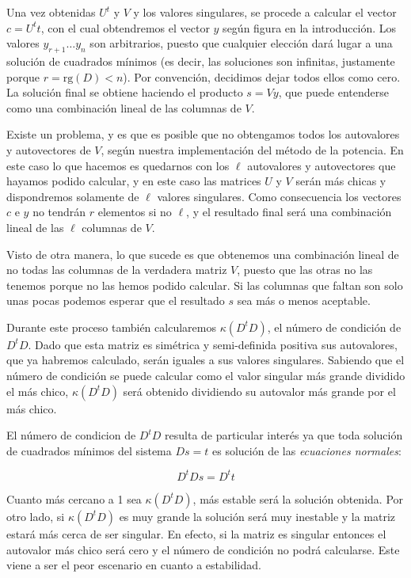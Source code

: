 \documentclass[a4paper]{article}
\begin{document}
Una vez obtenidas $U^t$ y $V$ y los valores singulares, se procede a calcular el vector $c = U^t t$, con el cual obtendremos el vector $y$ 
según figura en la introducción. Los valores $y_{r+1} \ldots y_n$ son arbitrarios, puesto que cualquier elección dará lugar a una solución 
de cuadrados mínimos (es decir, las soluciones son infinitas, justamente porque $r = \text{rg}(D) < n$). Por convención, decidimos dejar todos 
ellos como cero. La solución final se obtiene haciendo el producto $s = Vy$, que puede entenderse como una combinación lineal de las columnas de 
$V$.

Existe un problema, y es que es posible que no obtengamos todos los autovalores y autovectores de $V$, según nuestra implementación del 
método de la potencia. En este caso lo que hacemos es quedarnos con los $\ell$ autovalores y autovectores que hayamos podido calcular, y en 
este caso las matrices $U$ y $V$ serán más chicas y dispondremos solamente de $\ell$ valores singulares. Como consecuencia los vectores 
$c$ e $y$ no tendrán $r$ elementos si no $\ell$, y el resultado final será una combinación lineal de las $\ell$ columnas de $V$.

Visto de otra manera, lo que sucede es que obtenemos una combinación lineal de no todas las columnas de la verdadera matriz $V$, puesto que 
las otras no las tenemos porque no las hemos podido calcular. Si las columnas que faltan son solo unas pocas podemos esperar que el 
resultado $s$ sea más o menos aceptable.

Durante este proceso también calcularemos $\kappa(D^tD)$, el número de condición de $D^tD$. Dado que esta matriz es simétrica y semi-definida 
positiva sus autovalores, que ya habremos calculado, serán iguales a sus valores singulares. Sabiendo que el número de condición se puede calcular 
como el valor singular más grande dividido el más chico, $\kappa(D^tD)$ será obtenido dividiendo su autovalor más grande por el más chico.

El número de condicion de $D^tD$ resulta de particular interés ya que toda solución de cuadrados mínimos del sistema $Ds = t$ es solución de las 
\textit{ecuaciones normales}:

\[
D^tDs = D^tt
\]

Cuanto más cercano a 1 sea $\kappa(D^tD)$, más estable será la solución obtenida. Por otro lado, si $\kappa(D^tD)$ es muy grande la solución será 
muy inestable y la matriz estará más cerca de ser singular. En efecto, si la matriz es singular entonces el autovalor más chico será cero y el número 
de condición no podrá calcularse. Este viene a ser el peor escenario en cuanto a estabilidad.
\end{document}

